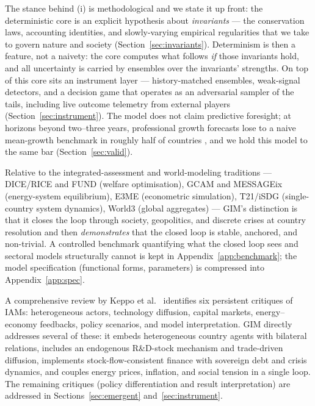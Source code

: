 \documentclass[a4paper,fleqn]{cas-sc}
\begin{document}
The stance behind (i) is methodological and we state it up front: the deterministic core is an
explicit hypothesis about \emph{invariants} --- the conservation laws, accounting identities,
and slowly-varying empirical regularities that we take to govern nature and society
(Section~\ref{sec:invariants}). Determinism is then a feature, not a naivety: the core computes
what follows \emph{if} those invariants hold, and all uncertainty is carried by ensembles over
the invariants' strengths. On top of this core sits an instrument layer --- history-matched
ensembles, weak-signal detectors, and a decision game that operates as an adversarial sampler
of the tails, including live outcome telemetry from external players
(Section~\ref{sec:instrument}). The model does not claim predictive foresight; at horizons beyond two--three years,
professional growth forecasts lose to a naive mean-growth benchmark in roughly half of countries
\citep{celasun2021}, and we hold this model to the same bar (Section~\ref{sec:valid}).

Relative to the integrated-assessment and world-modeling traditions --- DICE/RICE
\citep{nordhaus2017,nordhausyang1996} and FUND \citep{anthoff2013} (welfare optimisation), GCAM
\citep{calvin2019} and MESSAGEix \citep{huppmann2019} (energy-system equilibrium), E3ME
\citep{mercure2018} (econometric simulation), T21/iSDG \citep{barney2002} (single-country system
dynamics), World3 \citep{meadows1972} (global aggregates) --- GIM's distinction is that it closes
the loop through society, geopolitics, and discrete crises at country resolution and then
\emph{demonstrates} that the closed loop is stable, anchored, and non-trivial. A controlled
benchmark quantifying what the closed loop sees and sectoral models structurally cannot is kept
in Appendix~\ref{app:benchmark}; the model specification (functional forms, parameters) is
compressed into Appendix~\ref{app:spec}.

A comprehensive review by Keppo et al.~\citep{keppo2021} identifies six persistent critiques of
IAMs: heterogeneous actors, technology diffusion, capital markets, energy--economy feedbacks,
policy scenarios, and model interpretation. GIM directly addresses several of these: it embeds
heterogeneous country agents with bilateral relations, includes an endogenous R\&D-stock
mechanism and trade-driven diffusion, implements stock-flow-consistent finance with sovereign
debt and crisis dynamics, and couples energy prices, inflation, and social tension in a single
loop. The remaining critiques (policy differentiation and result interpretation) are addressed
in Sections~\ref{sec:emergent} and~\ref{sec:instrument}.
\end{document}
